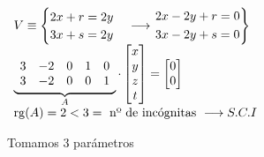 \begin{enumerate}[label=\color{red}\arabic*), leftmargin=*]
        $\begin{array}{l}
        	V\equiv\begin{cases}
        	2x+r=2y\\
        	3x+s=2y
        \end{cases}\longrightarrow\begin{rcases}
        2x-2y+r=0\\
        3x-2y+s=0
        \end{rcases}\\
        \underbrace{\begin{array}{ccccc}
        		3 & -2 & 0 & 1 & 0 \\
        		3 & -2 & 0 & 0 & 1
        \end{array}}_A\cdot\begin{bmatrix}
        x\\
        y\\
        z\\
        t
    \end{bmatrix}=\begin{bmatrix}
    0\\
    0
    \end{bmatrix}\\
    \mathrm{rg}(A)=2<3=\text{ nº de incógnitas }\longrightarrow S.C.I
        \end{array}$
        
        Tomamos 3 parámetros
        

\end{enumerate}

